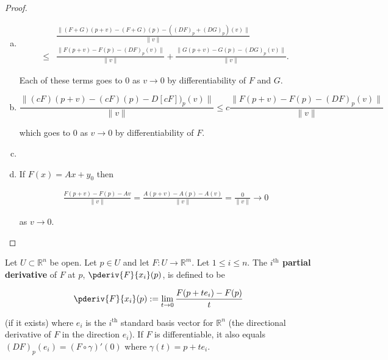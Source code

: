  \begin{proof}
 
  \begin{enumerate}[(a)]
 
 \item 
 
 \begin{align*}
&  \frac{ \lVert (F+G)(p+v) - (F+G)(p) - ( (DF)_p + (DG)_p)(v) \rVert}{\lVert v \rVert}
\\ \leq &  \frac{ \lVert F(p+v) - F(p) - (DF)_p (v) \rVert}{\lVert v \rVert} +  \frac{ \lVert G (p+v) - G(p) - (DG)_p(v) \rVert}{\lVert v \rVert}.
 \end{align*}
 
 Each of these terms goes to 0 as \(v \to 0\) by differentiability of \(F\) and \(G\).
 
 \item

 
 \[
  \frac{ \lVert (cF)(p+v) - (cF)(p) -  D[cF])_p (v) \rVert}{\lVert v \rVert}  \leq c  \frac{ \lVert F(p+v) - F(p) - (DF)_p (v) \rVert}{\lVert v \rVert} 
\]

which goes to 0 as \(v \to 0\) by differentiability of \(F\).

 \item 
 
 \item If \(F(x) = Ax + y_0\) then 
 
 \begin{align*}
 \frac{F(p+v) - F(p) - Av}{\lVert v \rVert} = \frac{ A(p+v) - A(p) - A(v) }{\lVert v \rVert} = \frac{0}{\lVert v \rVert} \to 0 
 \end{align*}
 
 as \(v \to 0\).
 
 \end{enumerate}
 
 \end{proof}
 
 \begin{definition}
 
 Let \(U \subset \mathbb{R}^n\) be open. Let \(p \in U\) and let \(F: U \to \mathbb{R}^m\). Let \(1 \leq i \leq n\). The \textbf{\(i^{\text{th}}\) partial derivative} of \(F\) at \(p\), \(\pderiv{F}{x_i}(p)\), is defined to be
 
 \[
 \pderiv{F}{x_i}(p) := \lim_{t \to 0} \frac{F(p +  t e_i) - F(p)}{t}
 \]
 
 (if it exists) where \(e_i\) is the \(i^{\text{th}}\) standard basis vector for \(\mathbb{R}^n\) (the directional derivative of \(F\) in the direction \(e_i\)). If \(F\) is differentiable, it also equals \((DF)_p(e_i) = (F \circ \gamma)'(0)\) where \(\gamma(t) = p + t e_i\). 
 
 \end{definition}
 
